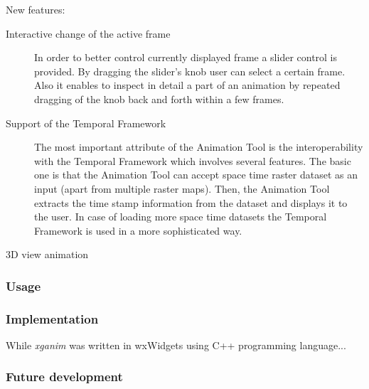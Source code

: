 \documentclass[a4paper,12pt]{article}
\newcommand{\mod}[1]{\textsl{#1}}
\newcommand{\tf}{Temporal Framework\xspace}
\newcommand{\at}{Animation Tool\xspace}
\begin{document}
New features:
    \begin{description}
      \item[Interactive change of the active frame]
      In order to better control currently displayed frame a slider control is provided.
      By dragging the slider's knob user can select a certain frame.
      Also it enables to inspect in detail a part of an animation
      by repeated dragging of the knob back and forth within a few frames.
      

      \item[Support of the \tf]
      The most important attribute of the \at is the interoperability with the \tf which involves several features.
      The basic one is that the \at can accept space time raster dataset as an input (apart from multiple raster maps).
      Then, the \at extracts the time stamp information from the dataset and displays it to the user.
      In case of loading more space time datasets the \tf is used in a more sophisticated way. 
      
      
      

      \item[3D view animation]

     \end{description}



\subsubsection{Usage}

\subsubsection{Implementation}
While \mod{xganim} was written in wxWidgets using C++ programming language...

\subsubsection{Future development}



















\newpage
\clearpage


\end{document}
